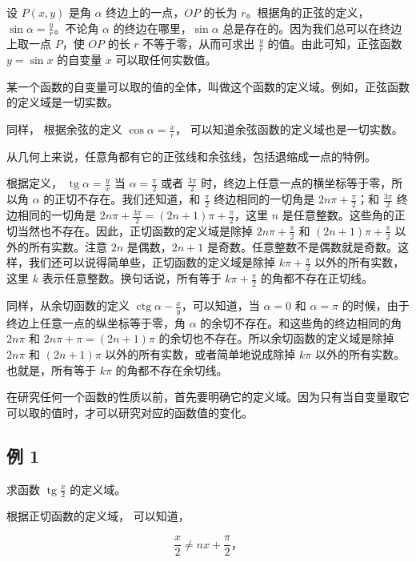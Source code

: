 设 \(P(x, y)\) 是角 \(\alpha\) 终边上的一点，\(OP\) 的长为
\(r\)。根据角的正弦的定义，\(\sin \alpha = \frac{y}{r}\)。不论角
\(\alpha\) 的终边在哪里，\(\sin \alpha\)
总是存在的。因为我们总可以在终边上取一点 \(P\)，使 \(OP\) 的长 \(r\)
不等于零，从而可求出 \(\frac{y}{r}\) 的值。由此可知，正弦函数
\(y = \sin x\) 的自变量 \(x\) 可以取任何实数值。

某一个函数的自变量可以取的值的全体，叫做这个函数的定义域。例如，正弦函数的定义域是一切实数。

同样， 根据余弦的定义 \(\cos \alpha = \frac{x}{r}\)，
可以知道余弦函数的定义域也是一切实数。

从几何上来说，任意角都有它的正弦线和余弦线，包括退缩成一点的特例。

根据定义， \(\operatorname{tg}\alpha = \frac{y}{x}\) 当
\(\alpha = \frac{\pi}{2}\) 或者 \(\frac{3\pi}{2}\)
时，终边上任意一点的横坐标等于零，所以角 \(\alpha\)
的正切不存在。我们还知道，和 \(\frac{\pi}{2}\) 终边相同的一切角是
\(2n\pi + \frac{\pi}{2}\)；和 \(\frac{3\pi}{2}\) 终边相同的一切角是
\(2n\pi + \frac{3\pi}{2} = (2n + 1)\pi + \frac{\pi}{2}\)，这里 \(n\)
是任意整数。这些角的正切当然也不存在。因此，正切函数的定义域是除掉
\(2n\pi + \frac{\pi}{2}\) 和 \((2n + 1)\pi + \frac{\pi}{2}\)
以外的所有实数。注意 \(2n\) 是偶数，\(2n + 1\)
是奇数。任意整数不是偶数就是奇数。这样，我们还可以说得简单些，正切函数的定义域是除掉
\(k\pi + \frac{\pi}{2}\) 以外的所有实数，这里 \(k\)
表示任意整数。换句话说，所有等于 \(k\pi + \frac{\pi}{2}\)
的角都不存在正切线。

同样，从余切函数的定义
\(\operatorname{ctg} \alpha - \frac{x}{y}\)，可以知道，当 \(\alpha = 0\)
和 \(\alpha = \pi\) 的时候，由于终边上任意一点的纵坐标等于零，角
\(\alpha\) 的余切不存在。和这些角的终边相同的角 \(2n\pi\) 和
\(2n\pi + \pi = (2n + 1)\pi\) 的余切也不存在。所以余切函数的定义域是除掉
\(2n\pi\) 和 \((2n + 1)\pi\) 以外的所有实数，或者简单地说成除掉 \(k\pi\)
以外的所有实数。也就是，所有等于 \(k\pi\) 的角都不存在余切线。

在研究任何一个函数的性质以前，首先要明确它的定义域。因为只有当自变量取它可以取的值时，才可以研究对应的函数值的变化。

\subsection{例 1}

求函数 \(\operatorname{tg} \frac{x}{2}\) 的定义域。

 根据正切函数的定义域， 可以知道，

\[
\frac {x}{2} \neq n x + \frac {\pi}{2}\text{，}
\]

